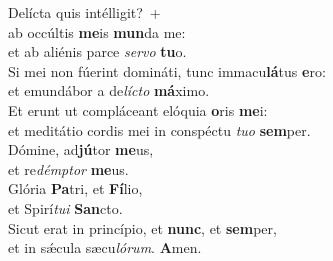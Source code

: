 \oddverse Delícta quis intélligit?~+\\
\oddverse  ab occúltis \textbf{me}is \textbf{mun}da me:~\*\\
\oddverse et ab aliénis parce \textit{ser}\textit{vo} \textbf{tu}o.\\
\evenverse Si mei non fúerint domináti, tunc immacu\textbf{lá}tus \textbf{e}ro:~\*\\
\evenverse et emundábor a de\textit{lí}\textit{cto} \textbf{má}ximo.\\
\oddverse Et erunt ut compláceant elóquia \textbf{o}ris \textbf{me}i:~\*\\
\oddverse et meditátio cordis mei in conspéctu \textit{tu}\textit{o} \textbf{sem}per.\\
\evenverse Dómine, ad\textbf{jú}tor \textbf{me}us,~\*\\
\evenverse et re\textit{dém}\textit{ptor} \textbf{me}us.\\
\oddverse Glória \textbf{Pa}tri, et \textbf{Fí}lio,~\*\\
\oddverse et Spirí\textit{tu}\textit{i} \textbf{San}cto.\\
\evenverse Sicut erat in princípio, et \textbf{nunc}, et \textbf{sem}per,~\*\\
\evenverse et in sǽcula sæcu\textit{ló}\textit{rum}. \textbf{A}men.\\
